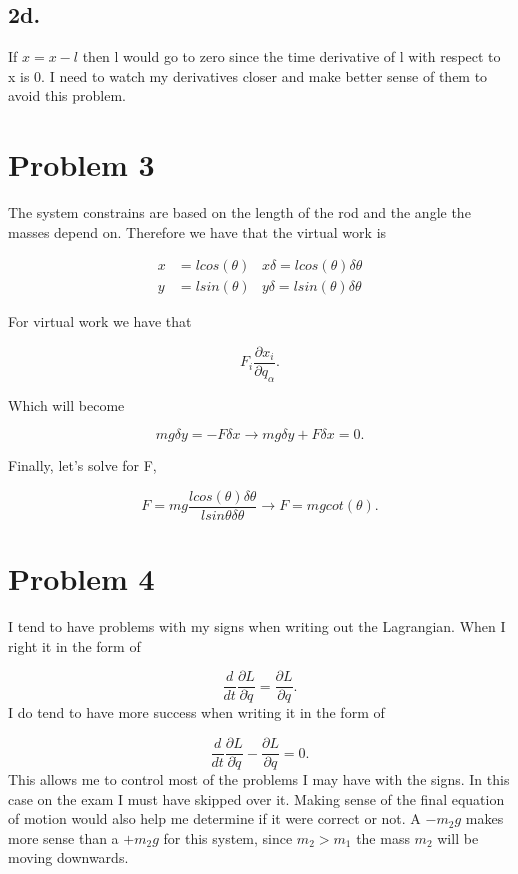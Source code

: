 \documentclass[12pt]{article}
\begin{document}
\subsection*{2d.}
\noindent
If $x = x - l$ then l would go to zero since the time derivative of l with respect to x is 0. I need to watch my derivatives closer and make better sense of them to avoid this problem. 

\section*{Problem 3}

The system constrains are based on the length of the rod and the angle the masses depend on. Therefore we have that the virtual work is 

\begin{align}
x &= lcos(\theta) & x\delta = lcos(\theta)\delta\theta \\
y &= lsin(\theta) & y\delta = lsin(\theta) \delta\theta
\end{align}

For virtual work we have that 

$$
F_{i}\frac{\partial x_{i}}{\partial q_{\alpha}}.
$$

Which will become

$$
mg\delta y = -F\delta x \rightarrow mg\delta y + F\delta x = 0.
$$

Finally, let's solve for F,

$$
F = mg\frac{lcos(\theta)\delta \theta}{lsin \theta \delta \theta} \rightarrow F = mgcot(\theta).
$$


\section*{Problem 4}
\noindent
I tend to have problems with my signs when writing out the Lagrangian. When I right it in the form of 

$$
\frac{d}{dt} \frac{\partial L}{\partial \dot{q}} = \frac{\partial L}{\partial q}.
$$
\noindent
I do tend to have more success when writing it in the form of 

$$
\frac{d}{dt} \frac{\partial L}{\partial \dot{q}} - \frac{\partial L}{\partial q} = 0.
$$
\noindent
This allows me to control most of the problems I may have with the signs. In this case on the exam I must have skipped over it. Making sense of the final equation of motion would also help me determine if it were correct or not. A $-m_{2}g$ makes more sense than a $+m_{2}g$ for this system, since $m_{2} > m_{1}$ the mass $m_{2}$ will be moving downwards.

 
\end{document}
